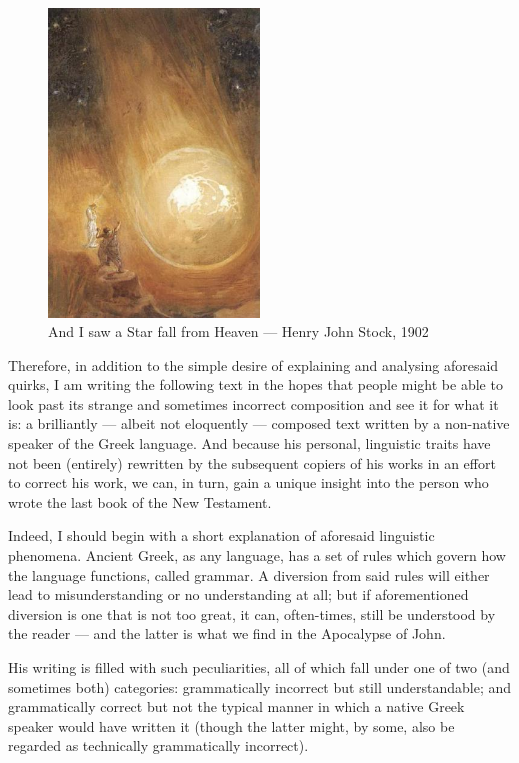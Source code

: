 \begin{figure}
	\centering
	\includegraphics[width=0.5\textwidth]{images/linguisticpeculiarities/fallenstar.jpg}
	\small\caption{And I saw a Star fall from Heaven — Henry John Stock, 1902}
\end{figure} 

Therefore, in addition to the simple desire of explaining and analysing aforesaid quirks, I am writing the following text in the hopes that people might be able to look past its strange and sometimes incorrect composition and see it for what it is: a brilliantly — albeit not eloquently — composed text written by a non-native speaker of the Greek language. And because his personal, linguistic traits have not been (entirely) rewritten by the subsequent copiers of his works in an effort to correct his work, we can, in turn, gain a unique insight into the person who wrote the last book of the New Testament.

Indeed, I should begin with a short explanation of aforesaid linguistic phenomena. Ancient Greek, as any language, has a set of rules which govern how the language functions, called grammar. A diversion from said rules will either lead to misunderstanding or no understanding at all; but if aforementioned diversion is one that is not too great, it can, often-times, still be understood by the reader — and the latter is what we find in the Apocalypse of John.

His writing is filled with such peculiarities, all of which fall under one of two (and sometimes both) categories: grammatically incorrect but still understandable; and grammatically correct but not the typical manner in which a native Greek speaker would have written it (though the latter might, by some, also be regarded as technically grammatically incorrect).

